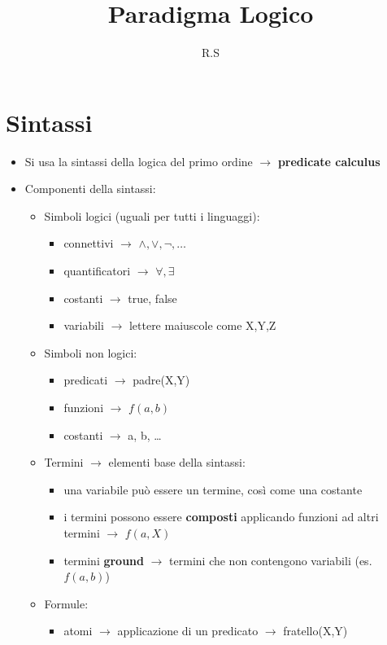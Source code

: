 \documentclass[12pt]{extarticle}
\title{Paradigma Logico}
\author{R.S}
\begin{document}
\maketitle

\section*{Sintassi}

\begin{itemize}
  \item Si usa la sintassi della logica del primo ordine $\rightarrow$ \textbf{predicate calculus}
  \item Componenti della sintassi:
  \begin{itemize}
    \item Simboli logici (uguali per tutti i linguaggi): 
    \begin{itemize}
      \item connettivi $\rightarrow$ $\wedge, \vee , \lnot, \dots$ 
      \item quantificatori $\rightarrow$ $\forall, \exists$
      \item costanti $\rightarrow$ true, false
      \item variabili $\rightarrow$ lettere maiuscole come X,Y,Z
    \end{itemize}
    \item Simboli non logici:
    \begin{itemize}
      \item predicati $\rightarrow$ padre(X,Y)
      \item funzioni $\rightarrow$ $f(a,b)$
      \item costanti $\rightarrow$ a, b, \dots
    \end{itemize}
    \item Termini $\rightarrow$ elementi base della sintassi: 
    \begin{itemize}
      \item una variabile può essere un termine, così come una costante
      \item i termini possono essere \textbf{composti} applicando funzioni ad altri termini $\rightarrow$ $f(a,X)$
      \item termini \textbf{ground} $\rightarrow$ termini che non contengono variabili (es. $f(a,b)$)
    \end{itemize}
    \item Formule:
    \begin{itemize}
      \item atomi $\rightarrow$ applicazione di un predicato $\rightarrow$ fratello(X,Y)

\end{itemize}
\end{itemize}
\end{itemize}
\end{document}
